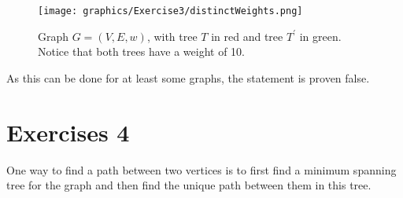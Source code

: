 \documentclass[nobib]{tufte-handout}
\begin{document}
\begin{figure}
    \centering
    \texttt{[image: graphics/Exercise3/distinctWeights.png]}
    \caption{Graph $G = (V,E,w)$, with tree $T$ in red and tree $T^\prime$ in green. Notice that both trees have a weight of 10.}
    \label{fig:distinctWeights}
\end{figure}

As this can be done for at least some graphs, the statement is proven false.
\newpage

\section{Exercises 4}

  One way to find a path between two vertices is to first find a minimum spanning tree for the graph and then find the unique path between them in this tree.  
\end{document}
